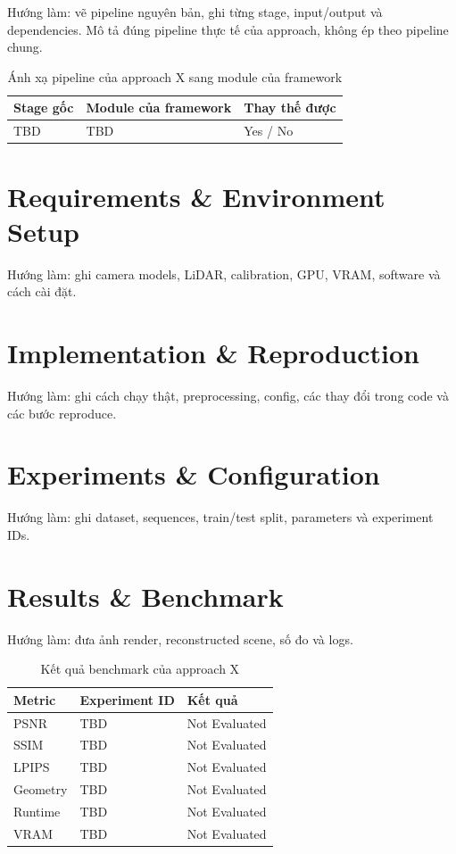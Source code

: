 Hướng làm: vẽ pipeline nguyên bản, ghi từng stage, input/output và dependencies.
Mô tả đúng pipeline thực tế của approach, không ép theo pipeline chung.

\begin{table}[H]
  \centering
  \caption{Ánh xạ pipeline của approach X sang module của framework}
  \begin{tabularx}{\linewidth}{X X l}
    \toprule
    \textbf{Stage gốc} & \textbf{Module của framework} & \textbf{Thay thế được} \\
    \midrule
    TBD & TBD & Yes / No \\
    \bottomrule
  \end{tabularx}
\end{table}

\section{Requirements \& Environment Setup}

Hướng làm: ghi camera models, LiDAR, calibration, GPU, VRAM, software và cách cài đặt.

\section{Implementation \& Reproduction}

Hướng làm: ghi cách chạy thật, preprocessing, config, các thay đổi trong code và các bước reproduce.

\section{Experiments \& Configuration}

Hướng làm: ghi dataset, sequences, train/test split, parameters và experiment IDs.

\section{Results \& Benchmark}

Hướng làm: đưa ảnh render, reconstructed scene, số đo và logs.

\begin{table}[H]
  \centering
  \caption{Kết quả benchmark của approach X}
  \begin{tabularx}{\linewidth}{X l l}
    \toprule
    \textbf{Metric} & \textbf{Experiment ID} & \textbf{Kết quả} \\
    \midrule
    PSNR & TBD & Not Evaluated \\
    SSIM & TBD & Not Evaluated \\
    LPIPS & TBD & Not Evaluated \\
    Geometry & TBD & Not Evaluated \\
    Runtime & TBD & Not Evaluated \\
    VRAM & TBD & Not Evaluated \\
    \bottomrule
  \end{tabularx}
\end{table}

